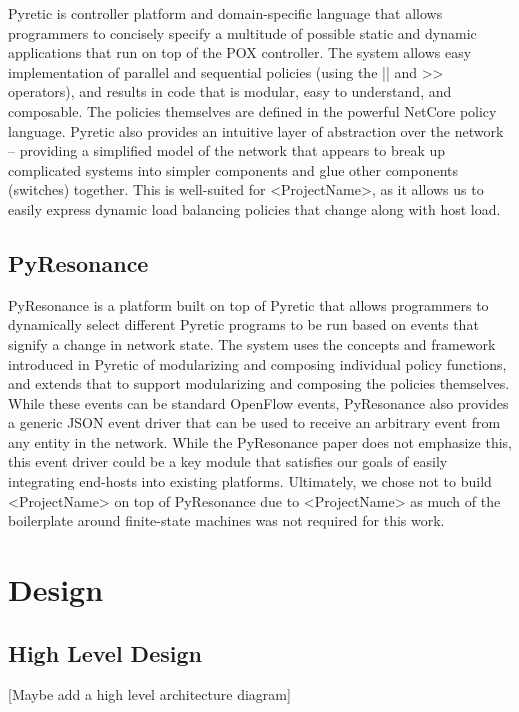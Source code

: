 \documentclass[10pt]{article}
\begin{document}
Pyretic\cite{Pyretic} is controller platform and domain-specific language that allows programmers to concisely specify a multitude of possible static and dynamic applications that run on top of the POX controller. The system allows easy implementation of parallel and sequential policies (using the || and >> operators), and results in code that is modular, easy to understand, and composable. The policies themselves are defined in the powerful NetCore policy language. Pyretic also provides an intuitive layer of abstraction over the network – providing a simplified model of the network that appears to break up complicated systems into simpler components and glue other components (switches) together. This is well-suited for <ProjectName>, as it allows us to easily express dynamic load balancing policies that change along with host load.


\subsection{PyResonance} 

PyResonance\cite{PyResonance} is a platform built on top of Pyretic that allows programmers to dynamically select different Pyretic programs to be run based on events that signify a change in network state. The system uses the concepts and framework introduced in Pyretic of modularizing and composing individual policy functions, and extends that to support modularizing and composing the policies themselves. While these events can be standard OpenFlow events, PyResonance also provides a generic JSON event driver that can be used to receive an arbitrary event from any entity in the network. While the PyResonance paper does not emphasize this, this event driver could be a key module that satisfies our goals of easily integrating end-hosts into existing platforms. Ultimately, we chose not to build <ProjectName> on top of PyResonance due to <ProjectName> as much of the boilerplate around finite-state machines was not required for this work.


\section{Design}

\subsection{High Level Design}

[Maybe add a high level architecture diagram]
\end{document}

